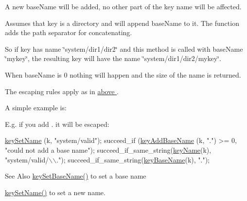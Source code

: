 A new base\-Name will be added, no other part of the key name will be affected.

Assumes that {\ttfamily key} is a directory and will append {\ttfamily base\-Name} to it. The function adds the path separator for concatenating.

So if {\ttfamily key} has name {\ttfamily \char`\"{}system/dir1/dir2\char`\"{}} and this method is called with {\ttfamily base\-Name} {\ttfamily \char`\"{}mykey\char`\"{}}, the resulting key will have the name {\ttfamily \char`\"{}system/dir1/dir2/mykey\char`\"{}}.

When {\ttfamily base\-Name} is 0 nothing will happen and the size of the name is returned.

The escaping rules apply as in \hyperlink{group__keyname}{above }.

A simple example is\-: 
 E.\-g. if you add . it will be escaped\-: 
\begin{DoxyCodeInclude}
\hyperlink{group__keyname_ga7699091610e7f3f43d2949514a4b35d9}{keySetName} (k, \textcolor{stringliteral}{"system/valid"});
succeed\_if (\hyperlink{group__keyname_gaa942091fc4bd5c2699e49ddc50829524}{keyAddBaseName} (k, \textcolor{stringliteral}{"."}) >= 0, \textcolor{stringliteral}{"could not add a base
       name"});
succeed\_if\_same\_string(\hyperlink{group__keyname_ga8e805c726a60da921d3736cda7813513}{keyName}(k), \textcolor{stringliteral}{"system/valid/\(\backslash\)\(\backslash\)."});
succeed\_if\_same\_string(\hyperlink{group__keyname_gaaff35e7ca8af5560c47e662ceb9465f5}{keyBaseName}(k), \textcolor{stringliteral}{"."});
\end{DoxyCodeInclude}
 \begin{DoxySeeAlso}{See Also}
\hyperlink{group__keyname_ga6e804bd453f98c28b0ff51430d1df407}{key\-Set\-Base\-Name()} to set a base name 

\hyperlink{group__keyname_ga7699091610e7f3f43d2949514a4b35d9}{key\-Set\-Name()} to set a new name.
\end{DoxySeeAlso}

